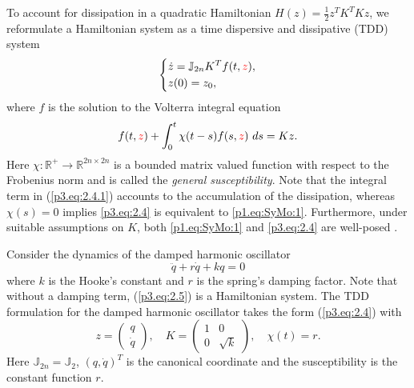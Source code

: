 To account for dissipation in a quadratic Hamiltonian $H(z) = \frac 1 2 z^T K^T K  z$, we reformulate a Hamiltonian system as a time dispersive and dissipative (TDD) \cite{figotin2007hamiltonian} system 
\begin{equation} \label{p3.eq:2.4}
	\left\{
	\begin{aligned}
		& \dot {z} = \mathbb J_{2n} K^T f(t,{\color{red} z}), \\
		& z(0) = z_0,
	\end{aligned}
	\right.
\end{equation}
where $f$ is the solution to the Volterra integral equation \cite{jerri1999introduction,corduneanu1991integral}
\begin{equation} \label{p3.eq:2.4.1}
	f(t,{\color{red} z}) + \int_0^t \chi(t-s) f(s,{\color{red} z})\ ds = K z.
\end{equation}
Here $\chi:\mathbb R^+\to \mathbb R^{2n\times 2n}$ is a bounded matrix valued function with respect to the Frobenius norm and is called the \emph{general susceptibility}. Note that the integral term in (\ref{p3.eq:2.4.1}) accounts to the accumulation of the dissipation, whereas $\chi(s) = 0$ implies \eqref{p3.eq:2.4} is equivalent to \eqref{p1.eq:SyMo:1}. Furthermore, under suitable assumptions on $K$, both \eqref{p1.eq:SyMo:1} and \eqref{p3.eq:2.4} are well-posed \cite{figotin2007hamiltonian}.

\begin{example} \label{example:2.1}
Consider the dynamics of the damped harmonic oscillator
\begin{equation} \label{p3.eq:2.5}
	\ddot q + r \dot q + k q = 0
\end{equation}
where $k$ is the Hooke's constant and $r$ is the spring's damping factor. Note that without a damping term, (\ref{p3.eq:2.5}) is a Hamiltonian system. The TDD formulation for the damped harmonic oscillator takes the form (\ref{p3.eq:2.4}) with
\begin{equation}
	z = \begin{pmatrix}
	q \\ \dot q
	\end{pmatrix},
       	\quad K = 
	\begin{pmatrix}
	1 & 0 \\
	0 & \sqrt{k}
	\end{pmatrix}, \quad \chi(t) = r.
\end{equation}
Here $\mathbb J_{2n} = \mathbb J_{2}$, $(q,\dot q)^T$ is the canonical coordinate and the susceptibility is the constant function $r$.
\end{example}

